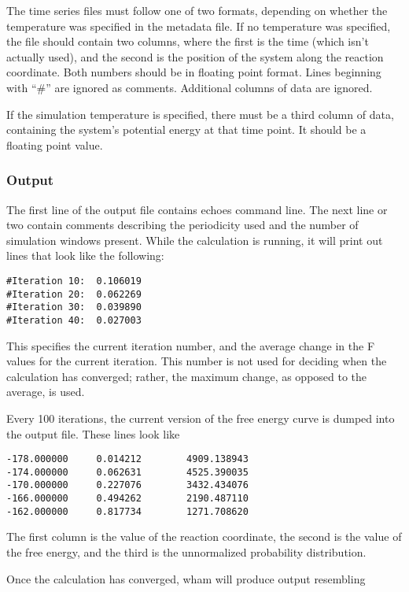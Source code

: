 \documentclass[12pt]{article}
\begin{document}
The time series files must follow one of two formats, depending on whether
the temperature was specified in the metadata file.  If no temperature was
specified, the file should contain two columns, where the first is the time
(which isn't actually used), and the second is the position of the system
along the reaction coordinate.  Both numbers should be in floating point
format.  Lines beginning with ``\#'' are ignored as comments.  Additional
columns of data are ignored.

If the simulation temperature is specified, there must be a third column of
data, containing the system's potential energy at that time point.  It
should be a floating point value.

\subsubsection{Output}

The first line of the output file contains echoes command line.  The next
line or two contain comments describing the periodicity used and the number
of simulation windows present.
While the calculation is running, it will print out lines that look like
the following:
\begin{verbatim}
#Iteration 10:  0.106019
#Iteration 20:  0.062269
#Iteration 30:  0.039890
#Iteration 40:  0.027003
\end{verbatim}

This specifies the current iteration number, and the average change in the
F values for the current iteration.  This number is not used for deciding
when the calculation has converged; rather, the maximum change, as opposed
to the average, is used.

Every 100 iterations, the current version of the free energy curve is dumped
into the output file.  These lines look like

\begin{verbatim}
-178.000000     0.014212        4909.138943
-174.000000     0.062631        4525.390035
-170.000000     0.227076        3432.434076
-166.000000     0.494262        2190.487110
-162.000000     0.817734        1271.708620
\end{verbatim}

The first column is the value of the reaction coordinate, the second is the
value of the free energy, and the third is the unnormalized probability
distribution.

Once the calculation has converged, wham will produce output resembling
\end{document}
